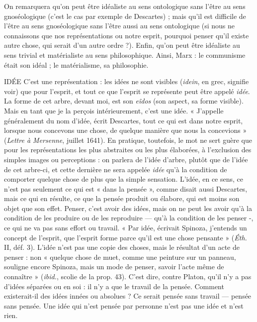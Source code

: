 On remarquera qu’on peut être idéaliste au sens ontologique sans l’être au
sens gnoséologique (c’est le cas par exemple de Descartes) ; mais qu’il est difficile
de l’être au sens gnoséologique sans l'être aussi au sens ontologique (si nous
ne connaissons que nos représentations ou notre esprit, pourquoi penser qu'il
existe autre chose, qui serait d’un autre ordre ?). Enfin, qu’on peut être idéaliste
au sens trivial et matérialiste au sens philosophique. Ainsi, Marx : le communisme
était son idéal ; le matérialisme, sa philosophie.

IDÉE C’est une représentation : les idées ne sont visibles ({\it idein}, en grec,
signifie voir) que pour l’esprit, et tout ce que l’esprit se représente
peut être appelé {\it idée}. La forme de cet arbre, devant moi, est son {\it eîdos} (son
aspect, sa forme visible). Mais en tant que je la perçois intérieurement, c’est
une idée. « J’appelle généralement du nom d’idée, écrit Descartes, tout ce qui
est dans notre esprit, lorsque nous concevons une chose, de quelque manière
que nous la concevions » ({\it Lettre à Mersenne}, juillet 1641). En pratique, toutefois,
le mot ne sert guère que pour les représentations les plus abstraites ou
les plus élaborées, à l'exclusion des simples images ou perceptions : on parlera
de l’idée d’arbre, plutôt que de l’idée de cet arbre-ci, et cette dernière ne sera
appelée {\it idée} qu’à la condition de comporter quelque chose de plus que la
simple sensation. L’idée, en ce sens, ce n’est pas seulement ce qui est « dans
la pensée », comme disait aussi Descartes, mais ce qui en résulte, ce que la
pensée produit ou élabore, qui est moins son objet que son effet. Penser, c’est
avoir des idées, mais on ne peut les avoir qu’à la condition de les produire ou
de les reproduire — qu’à la condition de les penser -, ce qui ne va pas sans
effort ou travail. « Par idée, écrivait Spinoza, j'entends un concept de l'esprit,
que l'esprit forme parce qu’il est une chose pensante » ({\it Éth.} II, déf. 3). L'idée
n’est pas une copie des choses, mais le résultat d’un acte de penser : non
« quelque chose de muet, comme une peinture sur un panneau, souligne
encore Spinoza, mais un mode de penser, savoir l’acte même de connaître »
({\it ibid.}, scolie de la prop. 43). C’est dire, contre Platon, qu’il n’y a pas d’idées
séparées ou en soi : il n’y a que le travail de la pensée. Comment existerait-il
des idées innées ou absolues ? Ce serait pensée sans travail — pensée sans
pensée. Une idée qui n’est pensée par personne n’est pas une idée et n’est
rien.

